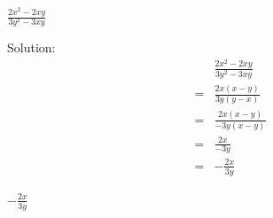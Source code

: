 \begin{mtask}[resume]
   \task \begin{exercise} $\frac{2x^2-2xy}{3y^2-3xy}$
              \begin{envSolution}[equal height group=grp-10-Alebra]
			      Solution:
			      \begin{align*}
			         & \frac{2x^2-2xy}{3y^2-3xy}                    \\
					=& \frac{2x(x-y)}{3y(y-x)}                      \\
                    =& \frac{2x(x-y)}{-3y(x-y)}                     \\
        			=& \frac{2x}{-3y}                               \\
					=& -\frac{2x}{3y} 
				 \end{align*}
                 \begin{shortsolution}  
				       $-\frac{2x}{3y}$
                 \end{shortsolution}
               \end{envSolution}
         \end{exercise}


\end{mtask}


